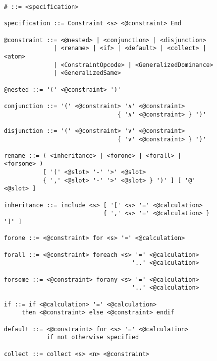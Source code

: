 \begin{figure}[h]
\begin{lstlisting}[language=BNF,basicstyle=\linespread{0.75}\small\ttfamily,
                   captionpos=t,caption=
   {Verbatim display of the grammar file that is used to generate the parser for
    CAnDL.
    The file is in a custom version of Backus–Naur form.
    In the parse tree, all expressions that start with ``{@}'' are
    automatically expanded.
    The character ``\#'' marks the top-level language construct.
    Any expression that does not ultimately become part of this construct
    constitutes a syntax error.\parfillskip=0pt}]
# ::= <specification>

specification ::= Constraint <s> <@constraint> End

@constraint ::= <@nested> | <conjunction> | <disjunction>
              | <rename> | <if> | <default> | <collect> | <atom>
              | <ConstraintOpcode> | <GeneralizedDominance>
              | <GeneralizedSame>

@nested ::= '(' <@constraint> ')'

conjunction ::= '(' <@constraint> '∧' <@constraint>
                                { '∧' <@constraint> } ')'

disjunction ::= '(' <@constraint> '∨' <@constraint>
                                { '∨' <@constraint> } ')'

rename ::= ( <inheritance> | <forone> | <forall> | <forsome> )
           [ '(' <@slot> '-' '>' <@slot>
           { ',' <@slot> '-' '>' <@slot> } ')' ] [ '@' <@slot> ]

inheritance ::= include <s> [ '[' <s> '=' <@calculation>
                            { ',' <s> '=' <@calculation> } ']' ]

forone ::= <@constraint> for <s> '=' <@calculation>

forall ::= <@constraint> foreach <s> '=' <@calculation>
                                    '..' <@calculation>

forsome ::= <@constraint> forany <s> '=' <@calculation>
                                    '..' <@calculation>

if ::= if <@calculation> '=' <@calculation>
     then <@constraint> else <@constraint> endif

default ::= <@constraint> for <s> '=' <@calculation>
            if not otherwise specified

collect ::= collect <s> <n> <@constraint>
\end{lstlisting}
\end{figure}

